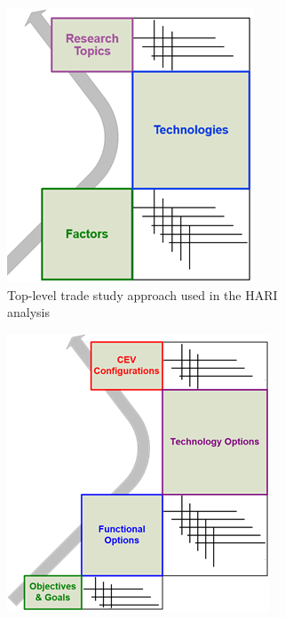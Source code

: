 \begin{figure}[tb!]
    \begin{center}
        \begin{subfigure}{0.49\textwidth}
            \includegraphics[width=\linewidth]{figures/TradeStudy/figure5a.png}
            \caption{Top-level trade study approach used in the HARI analysis}
            \label{figure-hari:tradestudyA}
        \end{subfigure}\hfill
        \begin{subfigure}{0.49\textwidth}
            \includegraphics[width=\linewidth]{figures/TradeStudy/figure5b.png}

\end{subfigure}
\end{center}
\end{figure}
